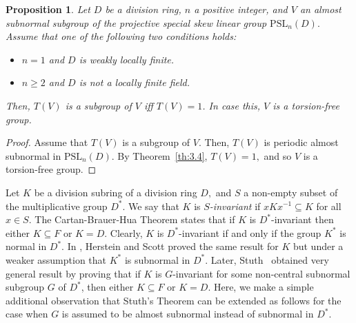 \documentclass{amsart}
\newtheorem{proposition}[theorem]{Proposition}
\theoremstyle{definition}
\begin{document}
\begin{proposition}\label{pro:3.7} Let $D$ be a division ring, $n$ a positive integer, and $V$ an almost subnormal subgroup of the projective special skew linear group $\mathrm{PSL}_n(D).$ Assume that one of the following two conditions holds:
	\begin{itemize}
		\item [(1)] $n=1$ and $D$ is weakly locally finite.
		\item [(2)] $n\geq 2$ and $D$ is not a locally finite field.
	\end{itemize}
	Then, $T(V)$ is a subgroup of $V$ iff $T(V)=1$. In case this, $V$ is a torsion-free group.
\end{proposition}
\begin{proof} Assume that $T(V)$ is a subgroup of $V.$ Then, $T(V)$ is periodic almost subnormal in $\mathrm{PSL}_n(D).$ By Theorem~\ref{th:3.4}, $T(V)=1,$ and so $V$ is a torsion-free group.
\end{proof} 
Let $K$ be a division subring of a division ring $D,$ and $S$ a non-empty subset of the multiplicative group $D^*.$ We say that $K$ is \textit{$S$-invariant}  if $xKx^{-1}\subseteq K$ for all $x\in S.$ The Cartan-Brauer-Hua Theorem states that if $K$ is  $D^*$-invariant then either $K\subseteq F$ or $K=D.$ Clearly, $K$ is $D^*$-invariant if and only if the group $K^*$ is normal in $D^*$. In \cite{Pa_HersteinScott_1963}, Herstein and Scott proved the same result for $K$ but under a weaker assumption that $K^*$ is subnormal in $D^*$. Later, Stuth~\cite[Theorem 1]{Pa_Stuth_1964} obtained very general result by proving that if $K$ is $G$-invariant for some non-central subnormal subgroup $G$ of $D^*$, then either $K\subseteq F$ or $K=D$. Here, we make a simple additional observation that Stuth's Theorem can be extended as follows for the case when $G$ is assumed to be almost subnormal instead of subnormal in $D^*$.
\end{document}
